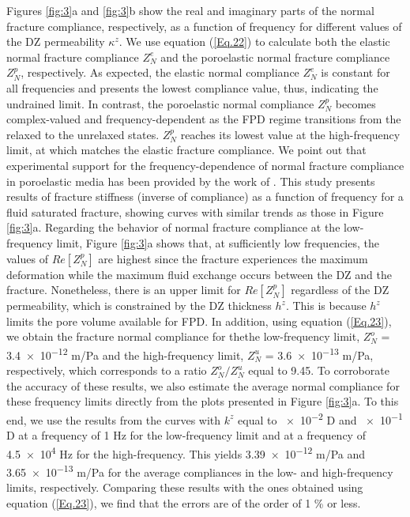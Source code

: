 \documentclass[draft]{agujournal2019}
\begin{document}
Figures \ref{fig:3}a and \ref{fig:3}b show the real and imaginary parts of the normal fracture compliance, respectively, as a function of frequency for different values of the DZ permeability 
$\kappa^z$. We use equation (\ref{Eq.22}) to calculate both the elastic normal fracture compliance $Z_N^e$ and the poroelastic normal fracture compliance $Z_N^p$, respectively. As expected, the elastic normal compliance $Z_N^e$ is constant for all frequencies and presents the lowest compliance value, thus, indicating the undrained limit. In contrast, the poroelastic normal compliance $Z_N^p$  becomes complex-valued and frequency-dependent as the FPD regime transitions from the relaxed  to the unrelaxed states.  $Z_N^p$ reaches its lowest value at the high-frequency limit, 
at which matches the elastic fracture compliance.
We point out that experimental support for the frequency-dependence of normal fracture compliance in poroelastic media has been provided by the work of . This study presents results of fracture stiffness (inverse of compliance) as a function of frequency for a fluid saturated fracture, showing curves with similar trends as those in Figure \ref{fig:3}a.
Regarding the behavior of normal fracture compliance at the low-frequency limit, Figure \ref{fig:3}a shows that,
at sufficiently low frequencies, the values of $Re[Z_N^p]$ are highest since the fracture experiences the maximum deformation while the maximum fluid exchange occurs between the DZ and the fracture. Nonetheless, there is an upper limit for $Re[Z_N^p]$ regardless of the DZ permeability, which is constrained by the DZ thickness $h^z$. This is because $h^z$ limits the pore volume available for FPD. 
In addition, using equation (\ref{Eq.23}), we obtain the fracture normal compliance for thethe low-frequency limit, $Z_N^o$ = \num{3.4e-12} m/Pa and the
high-frequency limit, $Z_N^u$ =  \num{3.6e-13}  m/Pa, respectively, which corresponds to a ratio $Z_N^o/Z_N^u$ equal to 9.45. To corroborate the accuracy of these results, we also estimate the average normal compliance for these frequency limits directly from the plots presented in Figure \ref{fig:3}a. To this end, we use the results from the curves with $k^z$ equal to \num{e-2} D and \num{e-1} D at a frequency of 1 Hz for the low-frequency limit and at a frequency of \num{4.5e4} Hz for the high-frequency. This yields \num{3.39e-12} m/Pa and \num{3.65e-13} m/Pa for the average compliances in the low- and high-frequency limits, respectively. Comparing these results with the ones obtained using equation (\ref{Eq.23}), we find that the errors are of the order of 1 \% or less.
\end{document}
